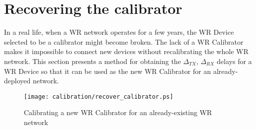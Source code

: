 \section{Recovering the calibrator}

In a real life, when a WR network operates for a few years, the WR Device selected
to be a calibrator might become broken. The lack of a WR Calibrator makes it
impossible to connect new devices without recalibrating the whole WR network.
This section presents a method for obtaining the $\Delta_{TX}$, $\Delta_{RX}$
delays for a WR Device so that it can be used as the new WR Calibrator for an
already-deployed network.

\begin{figure}[ht]
	\begin{center}
	\texttt{[image: calibration/recover\_calibrator.ps]}
	\caption{Calibrating a new WR Calibrator for an already-existing WR network}
	\label{fig:recover_calibrator}
	\end{center}
\end{figure}

